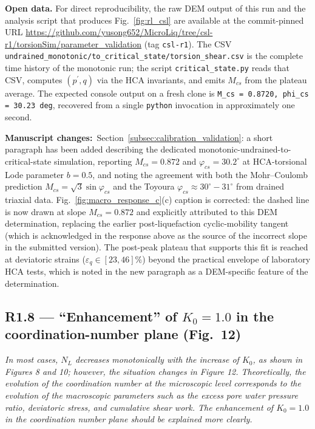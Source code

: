 \documentclass[11pt,a4paper]{article}
\newenvironment{rcomment}
  {\begin{leftbar}\color{black!75}\itshape}
  {\end{leftbar}\vspace{0.3em}}
\newcommand{\changed}[1]{\par\noindent\textbf{Manuscript changes:}\ #1\par}
\newcommand{\Kzero}{\ensuremath{K_0}}
\begin{document}
\medskip
\noindent\textbf{Open data.} For direct reproducibility, the raw
DEM output of this run and the analysis script that produces
Fig.~\ref{fig:rl_csl} are available at the commit-pinned URL
\url{https://github.com/yusong652/MicroLiq/tree/csl-r1/torsionSim/parameter_validation}
(tag \texttt{csl-r1}). The CSV
\texttt{undrained\_monotonic/to\_critical\_state/torsion\_shear.csv}
is the complete time history of the monotonic run; the script
\texttt{critical\_state.py} reads that CSV, computes
$(p^{\prime}, q)$ via the HCA invariants, and emits $M_{cs}$ from
the plateau average. The expected console output on a fresh clone
is \texttt{M\_cs = 0.8720, phi\_cs = 30.23 deg}, recovered from a
single \texttt{python} invocation in approximately one second.

\changed{Section~\ref{subsec:calibration_validation}: a short
paragraph has been added describing the dedicated
monotonic-undrained-to-critical-state simulation, reporting
$M_{cs}=0.872$ and $\varphi_{cs}=30.2^{\circ}$ at HCA-torsional
Lode parameter $b=0.5$, and noting the agreement with both the
Mohr--Coulomb prediction $M_{cs}=\sqrt{3}\sin\varphi_{cs}$ and the
Toyoura $\varphi_{cs}\approx 30^{\circ}\!-\!31^{\circ}$ from
drained triaxial data. Fig.~\ref{fig:macro_response_c}(c)
caption is corrected: the dashed line is now drawn at slope
$M_{cs}=0.872$ and explicitly attributed to this DEM determination,
replacing the earlier post-liquefaction cyclic-mobility tangent
(which is acknowledged in the response above as the source of the
incorrect slope in the submitted version). The post-peak plateau
that supports this fit is reached at deviatoric strains
($\varepsilon_q\in[23,46]\%$) beyond the practical envelope of
laboratory HCA tests, which is noted in the new paragraph as a
DEM-specific feature of the determination.}

\subsection*{R1.8 --- ``Enhancement'' of $\Kzero = 1.0$ in the coordination-number plane (Fig.~12)}

\begin{rcomment}
In most cases, $N_L$ decreases monotonically with the increase of $\Kzero$,
as shown in Figures 8 and 10; however, the situation changes in Figure 12.
Theoretically, the evolution of the coordination number at the microscopic
level corresponds to the evolution of the macroscopic parameters such as the
excess pore water pressure ratio, deviatoric stress, and cumulative shear
work. The enhancement of $\Kzero = 1.0$ in the coordination number plane
should be explained more clearly.
\end{rcomment}
\end{document}
